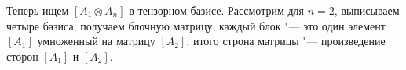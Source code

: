 Теперь ищем $[A_1 \otimes A_n]$ в тензорном базисе.
Рассмотрим для $n=2$, выписываем четыре базиса, получаем блочную матрицу, каждый блок "--- это один элемент $[A_1]$ умноженный
на матрицу $[A_2]$, итого строна матрицы "--- произведение сторон $[A_1]$ и $[A_2]$.

\section{} %

\section{} %

\section{} %

\section{} %
